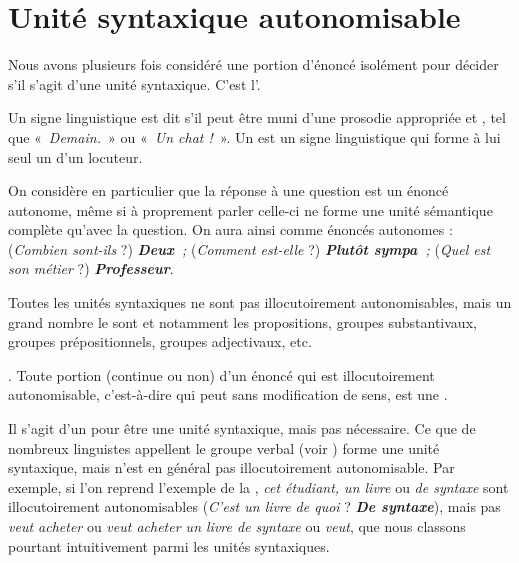 \section{Unité syntaxique autonomisable}\label{sec:3.2.11}

Nous avons plusieurs fois considéré une portion d’énoncé isolément pour décider s’il s’agit d’une unité syntaxique. C’est l’.

{Un signe linguistique est dit  s’il peut être muni d’une prosodie appropriée et , tel que «~\textit{Demain.~}» ou «~\textit{Un chat !~}». Un  est un signe linguistique qui forme à lui seul un  d’un locuteur.}

On considère en particulier que la réponse à une question est un énoncé autonome, même si à proprement parler celle-ci ne forme une unité sémantique complète qu’avec la question. On aura ainsi comme énoncés autonomes : (\textit{Combien sont-ils} ?) \textbf{\textit{Deux~}}\textit{;} (\textit{Comment est-elle} ?) \textbf{\textit{Plutôt sympa~}}\textit{;} (\textit{Quel est son métier} ?) \textbf{\textit{Professeur}}.

\begin{sloppypar}
Toutes les unités syntaxiques ne sont pas illocutoirement autonomisables, mais un grand nombre le sont et notamment les propositions, groupes substantivaux, groupes prépositionnels, groupes adjectivaux, etc.
\end{sloppypar}

{. Toute portion (continue ou non) d’un énoncé qui est illocutoirement autonomisable, c’est-à-dire qui peut  sans modification de sens, est une .}

Il s’agit d’un  pour être une unité syntaxique, mais pas nécessaire. Ce que de nombreux linguistes appellent le groupe verbal (voir ) forme une unité syntaxique, mais n’est en général pas illocutoirement autonomisable. Par exemple, si l’on reprend l’exemple de la , \textit{cet étudiant, un livre} ou \textit{de syntaxe} sont illocutoirement autonomisables (\textit{C’est un livre de quoi} ? \textbf{\textit{De syntaxe}}), mais pas \textit{veut acheter} ou \textit{veut acheter un livre de syntaxe} ou \textit{veut}, que nous classons pourtant intuitivement parmi les unités syntaxiques.

